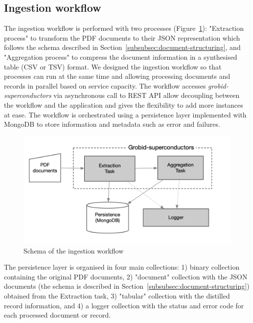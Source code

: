 \documentclass{article}
\begin{document}
\subsection{Ingestion workflow}
\label{subsec:ingestion-workflow}

The ingestion workflow is performed with two processes (Figure~\ref{fig:ingestion-workflow}): "Extraction process" to transform the PDF documents to their JSON representation which follows the schema described in Section~\ref{subsubsec:document-structuring}, and "Aggregation process" to compress the document information in a synthesised table (CSV or TSV) format.
We designed the ingestion workflow so that processes can run at the same time and allowing processing documents and records in parallel based on service capacity. 
The workflow accesses \textit{grobid-superconductors} via asynchronous call to REST API allow decoupling between the workflow and the application and gives the flexibility to add more instances at ease.
The workflow is orchestrated using a persistence layer implemented with MongoDB to store information and metadata such as error and failures.

\begin{figure}[ht]
\includegraphics[width=\textwidth]{workflow-schema-1}
\caption{Schema of the ingestion workflow}
\label{fig:ingestion-workflow}
\end{figure}

The persistence layer is organised in four main collections: 1) binary collection containing the original PDF documents, 2) "document" collection with the JSON documents (the schema is described in Section~\ref{subsubsec:document-structuring}) obtained from the Extraction task, 3) "tabular" collection with the distilled record information, and 4) a logger collection with the status and error code for each processed document or record. 
\end{document}
